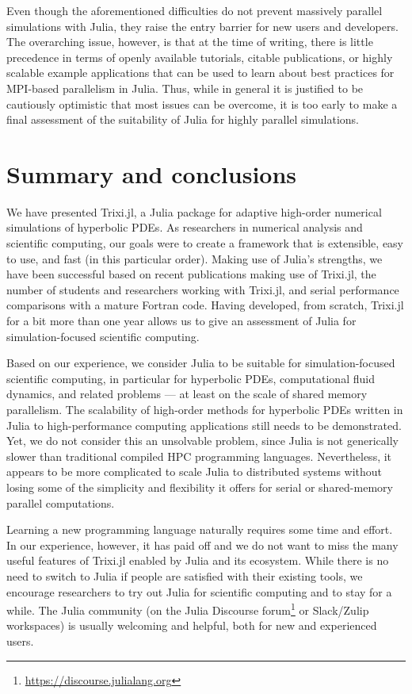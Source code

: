 \documentclass[hidelinks]{juliacon} %
\newcommand{\trixi}{Trixi.jl\xspace}
\begin{document}
Even though the aforementioned difficulties do not prevent massively parallel simulations with
Julia, they raise the entry barrier for new users and developers. The overarching issue, however, is
that at the time of writing, there is little precedence in terms of openly available tutorials,
citable publications, or highly scalable example applications that can be used to learn about best
practices for MPI-based parallelism in Julia. Thus, while in general it is justified to be cautiously
optimistic that most issues can be overcome, it is too early to make a final assessment of the
suitability of Julia for highly parallel simulations.


\section{Summary and conclusions}
\label{sec:summary}

We have presented \trixi, a Julia package for adaptive high-order numerical
simulations of hyperbolic PDEs. As researchers in numerical analysis and
scientific computing, our goals were to create a framework that is extensible,
easy to use, and fast (in this particular order). Making use of Julia's strengths,
we have been successful based on recent publications making use of \trixi,
the number of students and researchers working with \trixi, and serial performance
comparisons with a mature Fortran code. Having developed, from scratch, \trixi for a bit
more than one year allows us to give an assessment of Julia for simulation-focused
scientific computing.

Based on our experience, we consider Julia to be suitable for simulation-focused
scientific computing, in particular for hyperbolic PDEs, computational fluid
dynamics, and related problems --- at least on the scale of shared memory
parallelism. The scalability of high-order methods for hyperbolic PDEs written
in Julia to high-performance computing applications still needs to be demonstrated.
Yet, we do not consider this an unsolvable problem, since Julia is not
generically slower than traditional compiled HPC programming languages. Nevertheless,
it appears to be more complicated to scale Julia to distributed systems without losing some of the
simplicity and flexibility it offers for serial or shared-memory parallel computations.

Learning a new programming language naturally requires some time and effort.
In our experience, however, it has paid off and we do not want to miss the
many useful features of \trixi enabled by Julia and its ecosystem. While there is
no need to switch to Julia if people are satisfied with their existing
tools, we encourage researchers to try out Julia for scientific computing and to stay for a while.
The Julia
community (on the Julia Discourse forum\footnote{\url{https://discourse.julialang.org}}
or Slack/Zulip workspaces) is usually welcoming and helpful, both for new and
experienced users.
\end{document}
